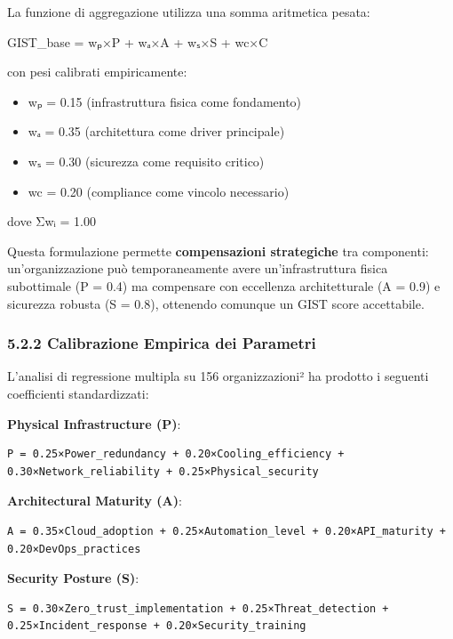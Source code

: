 \documentclass{report}
\providecommand{\tightlist}{%
  \setlength{\itemsep}{0pt}\setlength{\parskip}{0pt}
}
\begin{document}
La funzione di aggregazione utilizza una somma aritmetica pesata:

GIST\_base = wₚ×P + wₐ×A + wₛ×S + wc×C

con pesi calibrati empiricamente:

\begin{itemize}
\tightlist
\item
  wₚ = 0.15 (infrastruttura fisica come fondamento)\\
\item
  wₐ = 0.35 (architettura come driver principale)\\
\item
  wₛ = 0.30 (sicurezza come requisito critico)\\
\item
  wc = 0.20 (compliance come vincolo necessario)
\end{itemize}

dove Σwᵢ = 1.00

Questa formulazione permette \textbf{compensazioni strategiche} tra
componenti: un'organizzazione può temporaneamente avere
un'infrastruttura fisica subottimale (P = 0.4) ma compensare con
eccellenza architetturale (A = 0.9) e sicurezza robusta (S = 0.8),
ottenendo comunque un GIST score accettabile.

\subsubsection{5.2.2 Calibrazione Empirica dei
Parametri}\label{calibrazione-empirica-dei-parametri}

L'analisi di regressione multipla su 156 organizzazioni² ha prodotto i
seguenti coefficienti standardizzati:

\textbf{Physical Infrastructure (P)}:

\begin{verbatim}
P = 0.25×Power_redundancy + 0.20×Cooling_efficiency + 0.30×Network_reliability + 0.25×Physical_security
\end{verbatim}

\textbf{Architectural Maturity (A)}:

\begin{verbatim}
A = 0.35×Cloud_adoption + 0.25×Automation_level + 0.20×API_maturity + 0.20×DevOps_practices
\end{verbatim}

\textbf{Security Posture (S)}:

\begin{verbatim}
S = 0.30×Zero_trust_implementation + 0.25×Threat_detection + 0.25×Incident_response + 0.20×Security_training
\end{verbatim}
\end{document}
